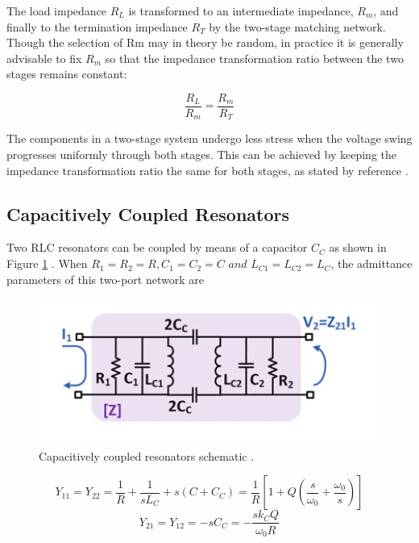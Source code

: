 The load impedance $R_L$ is transformed to an intermediate impedance, $R_m$, and finally to the termination impedance $R_T$ by the two-stage matching network. Though the selection of Rm may in theory be random, in practice it is generally advisable to fix $R_m$ so that the impedance transformation ratio between the two stages remains constant:

\begin{equation}
    \frac{R_L}{R_m}=\frac{R_m}{R_T}
\end{equation}

The components in a two-stage system undergo less stress when the voltage swing progresses uniformly through both stages. This can be achieved by keeping the impedance transformation ratio the same for both stages, as stated by reference \cite{rf-PA-wireless-communications}.
\subsection{Capacitively Coupled Resonators}
Two RLC resonators can be coupled by means of a capacitor $C_C$ as shown in Figure \ref{fig:capacitively-coupled-resonators} \cite{5710437}. When $R_1 = R_2 = R, C_1 = C_2 = C \textit{ and } L_{C1} = L_{C2} = L_C$, the admittance
parameters of this two-port network are

\begin{figure}[h]
    \centering
    \includegraphics{figures/capicitively-coupled-resonator.PNG}
    \caption{Capacitively coupled resonators schematic \cite{5G-and-E-band}.}
    \label{fig:capacitively-coupled-resonators}
\end{figure}

\begin{equation}
    Y_{11}=Y_{22}=\frac{1}{R}+\frac{1}{sL_C}+s\left (C+C_C\right)=\frac{1}{R}\left [1+Q\left (\frac{s}{\omega_0}+\frac{\omega_0}{s}\right)\right]
\end{equation}
\begin{equation}
    Y_{21}=Y_{12}=-sC_C=-\frac{sk_CQ}{\omega_0 R}
\end{equation}

